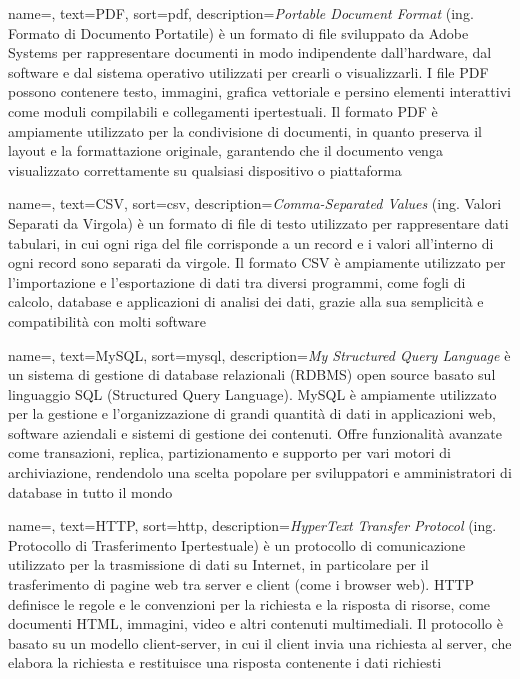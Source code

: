  {
    name=,
    text=PDF,
    sort=pdf,
    description={\emph{Portable Document Format} (ing. Formato di Documento Portatile) è un formato di file sviluppato da Adobe Systems per rappresentare documenti in modo indipendente dall'hardware, dal software e dal sistema operativo utilizzati per crearli o visualizzarli. I file PDF possono contenere testo, immagini, grafica vettoriale e persino elementi interattivi come moduli compilabili e collegamenti ipertestuali. Il formato PDF è ampiamente utilizzato per la condivisione di documenti, in quanto preserva il layout e la formattazione originale, garantendo che il documento venga visualizzato correttamente su qualsiasi dispositivo o piattaforma}
}

 {
    name=,
    text=CSV,
    sort=csv,
    description={\emph{Comma-Separated Values} (ing. Valori Separati da Virgola) è un formato di file di testo utilizzato per rappresentare dati tabulari, in cui ogni riga del file corrisponde a un record e i valori all'interno di ogni record sono separati da virgole. Il formato CSV è ampiamente utilizzato per l'importazione e l'esportazione di dati tra diversi programmi, come fogli di calcolo, database e applicazioni di analisi dei dati, grazie alla sua semplicità e compatibilità con molti software}
}

 {
    name=,
    text=MySQL,
    sort=mysql,
    description={\emph{My Structured Query Language} è un sistema di gestione di database relazionali (RDBMS) open source basato sul linguaggio SQL (Structured Query Language). MySQL è ampiamente utilizzato per la gestione e l'organizzazione di grandi quantità di dati in applicazioni web, software aziendali e sistemi di gestione dei contenuti. Offre funzionalità avanzate come transazioni, replica, partizionamento e supporto per vari motori di archiviazione, rendendolo una scelta popolare per sviluppatori e amministratori di database in tutto il mondo}
}

 {
    name=,
    text=HTTP,
    sort=http,
    description={\emph{HyperText Transfer Protocol} (ing. Protocollo di Trasferimento Ipertestuale) è un protocollo di comunicazione utilizzato per la trasmissione di dati su Internet, in particolare per il trasferimento di pagine web tra server e client (come i browser web). HTTP definisce le regole e le convenzioni per la richiesta e la risposta di risorse, come documenti HTML, immagini, video e altri contenuti multimediali. Il protocollo è basato su un modello client-server, in cui il client invia una richiesta al server, che elabora la richiesta e restituisce una risposta contenente i dati richiesti}
}

